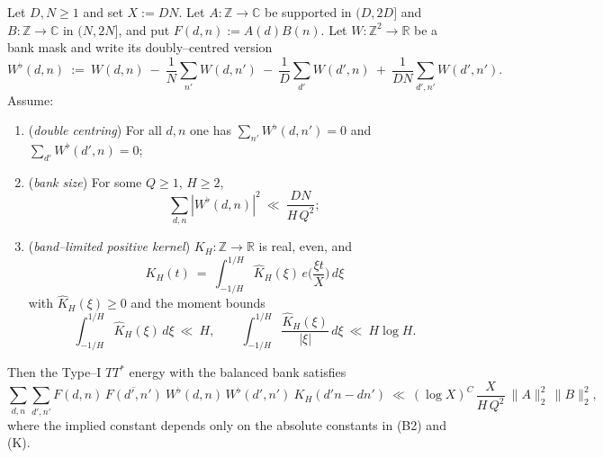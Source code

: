 \begin{theorem}\label{thm:typeI-leak}
Let $D,N\ge1$ and set $X:=DN$. Let $A:\mathbb Z\to\mathbb C$ be supported in $(D,2D]$ and $B:\mathbb Z\to\mathbb C$ in $(N,2N]$, and put $F(d,n):=A(d)B(n)$. Let $W:\mathbb Z^2\to\mathbb R$ be a bank mask and write its doubly--centred version
\[
W^\flat(d,n)\ :=\ W(d,n)\ -\ \frac{1}{N}\!\sum_{n'}W(d,n')\ -\ \frac{1}{D}\!\sum_{d'}W(d',n)\ +\ \frac{1}{DN}\!\sum_{d',n'}W(d',n').
\]
Assume:
\begin{enumerate}
\item[\textnormal{(B1)}] (\emph{double centring}) For all $d,n$ one has $\sum_{n'}W^\flat(d,n')=0$ and $\sum_{d'}W^\flat(d',n)=0$;
\item[\textnormal{(B2)}] (\emph{bank size}) For some $Q\ge1$, $H\ge2$,
\[
\sum_{d,n} |W^\flat(d,n)|^2\ \ll\ \frac{DN}{H\,Q^{2}} ;
\]
\item[\textnormal{(K)}] (\emph{band--limited positive kernel}) $K_H:\mathbb Z\to\mathbb R$ is real, even, and
\[
K_H(t)\ =\ \int_{-1/H}^{1/H}\widehat K_H(\xi)\,e\!\Big(\frac{\xi t}{X}\Big)\,d\xi
\]
with $\widehat K_H(\xi)\ge0$ and the moment bounds
\[
\int_{-1/H}^{1/H}\!\widehat K_H(\xi)\,d\xi\ \ll\ H,
\qquad
\int_{-1/H}^{1/H}\!\frac{\widehat K_H(\xi)}{|\xi|}\,d\xi\ \ll\ H\log H.
\]
\end{enumerate}
Then the Type--I $TT^*$ energy with the balanced bank satisfies
\[
\sum_{d,n}\sum_{d',n'}\!F(d,n)\,\overline{F(d',n')}\ W^\flat(d,n)\,W^\flat(d',n')\ K_H(d'n-dn')
\ \ll\ (\log X)^C\,\frac{X}{H\,Q^{2}}\ \|A\|_2^2\,\|B\|_2^2,
\]
where the implied constant depends only on the absolute constants in \textnormal{(B2)} and \textnormal{(K)}.
\end{theorem}

